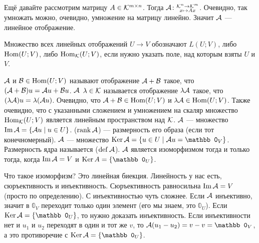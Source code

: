 \documentclass{article}
\DeclareMathOperator{\operIm}{Im}
\let\Im\operIm
\begin{document}
\begin{itemize}
        \begin{Example}
            Ещё давайте рассмотрим матрицу $A\in{\mathcal{K}}^{m\times n}$. Тогда ${\mathcal{A}}\colon\substack{{\mathcal{K}}^n\to{\mathcal{K}}^m\\x\mapsto Ax}$. Очевидно, так умножать можно, очевидно, умножение на матрицу линейно. Значит ${\mathcal{A}}$ --- линейное отображение.
        \end{Example}
        \begin{Comment}
            Множество всех линейных отображений $U\to V$ обозначают $L(U;V)$, либо $\operatorname{Hom}(U;V)$, либо $\operatorname{Hom}_{\mathcal{K}}(U;V)$, если нужно указать поле, над которым взяты $U$ и $V$.
        \end{Comment}
        \dfn {} ${\mathcal{A}}$ и ${\mathcal{B}}\in\operatorname{Hom}(U;V)$ называют отображение ${\mathcal{A}}+{\mathcal{B}}$ такое, что $({\mathcal{A}}+{\mathcal{B}})u={\mathcal{A}} u+{\mathcal{B}} u$.
        \dfn {} ${\mathcal{A}}$  $\lambda\in{\mathcal{K}}$ называется отображение $\lambda{\mathcal{A}}$ такое, что $(\lambda{\mathcal{A}})u=\lambda({\mathcal{A}} u)$.
        \thm Очевидно, что ${\mathcal{A}}+{\mathcal{B}}\in\operatorname{Hom}(U;V)$ и $\lambda{\mathcal{A}}\in\operatorname{Hom}(U;V)$.
        \thm Также очевидно, что с указанными сложением и умножением на скаляр множество $\operatorname{Hom}_{\mathcal{K}}(U;V)$ является линейным пространством над ${\mathcal{K}}$.
        \dfn {} ${\mathcal{A}}$ --- множество $\Im\scriptA=\{\scriptA u\mid u\in U\}$.
        \dfn {} ($\operatorname{rank}{\mathcal{A}}$) --- размерность его образа (если тот конечномерный).
        \dfn {} ${\mathcal{A}}$ --- множество $\Ker\scriptA=\{u\in U\mid\scriptA u=\mathbb0_V\}$.
        \dfn Размерность ядра называется  ($\operatorname{def}{\mathcal{A}}$).
        \thm ${\mathcal{A}}$ является изоморфизмом тогда и только тогда, когда $\Im\scriptA=V$ и $\Ker A=\{\mathbb0_U\}$.
        \begin{Proof}
            Что такое изоморфизм? Это линейная биекция. Линейность у нас есть, сюръективность и инъективность. Сюръективность равносильна $\Im\scriptA=V$ (просто по определению). С инъективностью чуть сложнее. Если ${\mathcal{A}}$ инъективно, значит в $\mathbb0_V$ переходит только один элемент (его мы знаем, это $\mathbb0_U$). Если $\Ker\scriptA=\{\mathbb0_U\}$, то нужно доказать инъективность. Если инъективности нет и $u_1$ и $u_2$ переходят в один и тот же $v$, то $\scriptA(u_1-u_2)=v-v=\mathbb0_V$, а это противоречие с $\Ker\scriptA=\{\mathbb0_U\}$.

\end{Proof}
\end{itemize}
\end{document}
